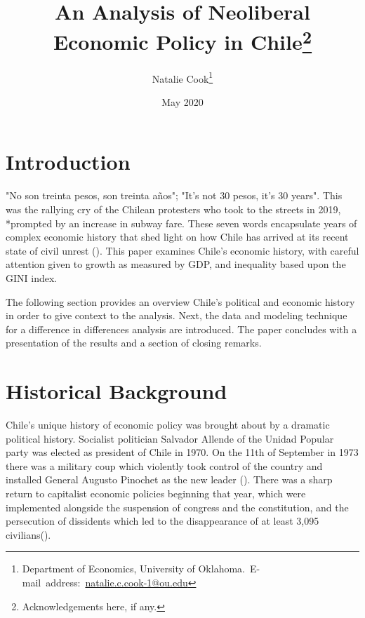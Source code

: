 \documentclass[12pt,english]{article}
\begin{document}
\begin{singlespace}
\title{An Analysis of Neoliberal Economic Policy in Chile\thanks{Acknowledgements here, if any.}}
\end{singlespace}

\author{Natalie Cook\thanks{Department of Economics, University of Oklahoma.\
E-mail~address:~\href{mailto:natalie.c.cook-1@ou.edu}{natalie.c.cook-1@ou.edu}}}

\date{May 2020}

\maketitle


\vfill{}


\pagebreak{}


\section{Introduction}\label{sec:intro}
"No son treinta pesos, son treinta años"; "It's not 30 pesos, it's 30 years". This was the rallying cry of the Chilean protesters who took to the streets in 2019, *prompted by an increase in subway fare. These seven words encapsulate years of complex economic history that shed light on how Chile has arrived at its recent state of civil unrest (\citet{Boccardo}). This paper examines Chile's economic history, with careful attention given to growth as measured by GDP, and inequality based upon the GINI index. 

The following section provides an overview Chile's political and economic history in order to give context to the analysis. Next, the data and modeling technique for a difference in differences analysis are introduced. The paper concludes with a presentation of the results and a section of closing remarks. 

\section{Historical Background}\label{sec:litreview}

Chile's unique history of economic policy was brought about by a dramatic political history. Socialist politician Salvador Allende of the Unidad Popular party was elected as president of Chile in 1970. On the 11th of September in 1973 there was a military coup which violently took control of the country and installed General Augusto Pinochet as the new leader (\citet{10.2307/23596588}). There was a sharp return to capitalist economic policies beginning that year, which were implemented alongside the suspension of congress and the constitution, and the persecution of dissidents which led to the disappearance of at least 3,095 civilians(\citet{chicago}). 
\end{document}
